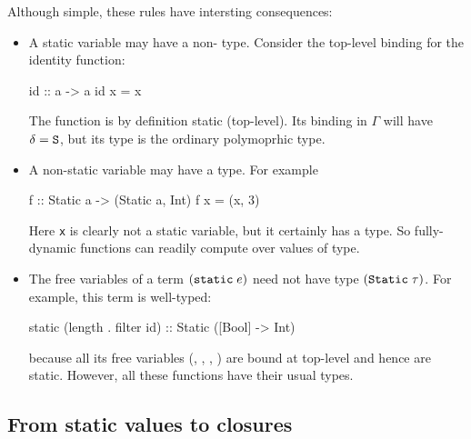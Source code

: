 \documentclass[preprint]{sigplanconf}
\begin{document}
Although simple, these rules have intersting consequences:
\begin{itemize}
\item A static variable may have a non- type. Consider the 
top-level binding for the identity function:
\begin{code}
  id :: a -> a
  id x = x
\end{code}
The function  is by definition static (top-level).  Its binding
in $\Gamma$ will have $\delta=\text{\tt S}$, but its type is the ordinary
polymoprhic type.

\item A non-static variable may have a  type.  For example
\begin{code}
  f :: Static a -> (Static a, Int)
  f x = (x, 3)
\end{code}
Here \texttt{x} is clearly not a static variable, but it certainly has
a  type.  So fully-dynamic functions
can readily compute over values of  type.

\item The free variables of a term $(\text{\tt static}\;e)$ need not have
type $(\text{\tt Static}\;\tau)$. For example, this term is well-typed:
\begin{code}
  static (length . filter id) :: Static ([Bool] -> Int)
\end{code}
because all its free variables (, ,
, ) are bound at top-level and hence are
static. However, all these functions have their usual types.
\end{itemize}

\subsection{From static values to closures}
\end{document}
